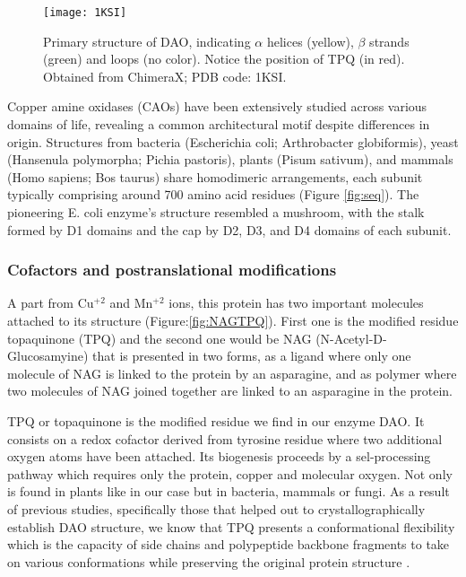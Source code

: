 \documentclass[a4paper]{article}
\begin{document}
\begin{figure}[h]
    \centering
    \texttt{[image: 1KSI]}
    \caption{Primary structure of DAO, indicating $\alpha$ helices (yellow), $\beta$ strands (green) and loops (no color). Notice the position of TPQ (in red). Obtained from ChimeraX; PDB code: 1KSI.}
\label{fig:structure}
\end{figure}


Copper amine oxidases (CAOs) have been extensively studied across various domains of life\cite{mcgrath_structure_2009}, revealing a common architectural motif despite differences in origin. Structures from bacteria (Escherichia coli; Arthrobacter globiformis), yeast (Hansenula polymorpha; Pichia pastoris), plants (Pisum sativum), and mammals (Homo sapiens; Bos taurus) share homodimeric arrangements\cite{floris_copper_2009}, each subunit typically comprising around 700 amino acid residues (Figure \ref{fig:seq}). The pioneering E. coli enzyme's structure\cite{parsons_crystal_1995} resembled a mushroom, with the stalk formed by D1 domains and the cap by D2, D3, and D4 domains of each subunit. 

\subsubsection{Cofactors and postranslational modifications}

A part from Cu$^{+2}$ and Mn$^{+2}$  ions, this protein has two important molecules attached to its structure (Figure:\ref{fig:NAGTPQ}). First one is the modified residue topaquinone (TPQ) and the second one would be NAG (N-Acetyl-D-Glucosamyine) that is presented in two forms, as a ligand where only one molecule of NAG is linked to the protein by an asparagine, and as polymer where two molecules of NAG joined together are linked to an asparagine in the protein.

TPQ or topaquinone is the modified residue we find in our enzyme DAO. It consists on a redox cofactor derived from tyrosine residue where two additional oxygen atoms have been attached. Its biogenesis proceeds by a sel-processing pathway which requires only the protein, copper and molecular oxygen. Not only is found in plants like in our case but in bacteria, mammals or fungi.
As a result of previous studies, specifically those that helped out to crystallographically establish DAO structure, we know that TPQ presents a conformational flexibility which is the capacity of side chains and polypeptide backbone fragments to take on various conformations while preserving the original protein structure \cite{1ksi}.
\end{document}
